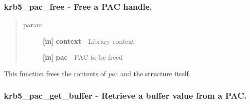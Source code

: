 \documentclass[letterpaper,10pt,english]{sphinxmanual}
\begin{document}
\subsubsection{krb5\_pac\_free -  Free a PAC handle.}
\label{appdev/refs/api/krb5_pac_free:krb5-pac-free-free-a-pac-handle}\label{appdev/refs/api/krb5_pac_free::doc}

\begin{fulllineitems}
\label{appdev/refs/api/krb5_pac_free:c.krb5_pac_free}
\end{fulllineitems}

\begin{quote}\begin{description}
\item[{param}] \leavevmode
\textbf{{[}in{]}} \textbf{context} - Library context

\textbf{{[}in{]}} \textbf{pac} - PAC to be freed

\end{description}\end{quote}

This function frees the contents of \emph{pac} and the structure itself.


\subsubsection{krb5\_pac\_get\_buffer -  Retrieve a buffer value from a PAC.}
\label{appdev/refs/api/krb5_pac_get_buffer::doc}\label{appdev/refs/api/krb5_pac_get_buffer:krb5-pac-get-buffer-retrieve-a-buffer-value-from-a-pac}

\begin{fulllineitems}
\label{appdev/refs/api/krb5_pac_get_buffer:c.krb5_pac_get_buffer}
\end{fulllineitems}
\end{document}
